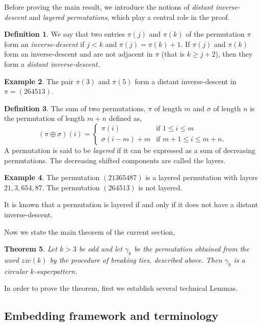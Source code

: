 \documentclass[a4paper,12pt]{article}
\newtheorem{theorem}{Theorem}[section]
\theoremstyle{definition}
\newtheorem{definition}[theorem]{Definition}
\newtheorem{eg}[theorem]{Example}
\numberwithin{equation}{section}
\begin{document}
 Before proving the main result, we introduce the notions of \emph{distant inverse-descent} and \emph{layered permutations}, which play a central role in the proof.

\begin{definition}\cite[Distant inverse-descent]{engen2020containing}
    We say that two entries $\pi(j)$ and $\pi(k)$ of the permutation $\pi$ form an \emph{inverse-descent} if $j<k$ and $\pi(j)=\pi(k)+1$. If $\pi(j)$ and $\pi(k)$ form an inverse-descent and are not adjacent in $\pi$ (that is $k\geq j+2$), then they form a \emph{distant inverse-descent.}
\end{definition}
\begin{eg}
    The pair $\pi(3)$ and $\pi(5)$ form a distant inverse-descent in $\pi=(264513).$
\end{eg}

\begin{definition}\cite[Layered permutation]{engen2020containing}
    The sum of two permutations, $\pi$ of length $m$ and $\sigma$ of length $n$ is the permutation of length $m+n$ defined as, $$(\pi\oplus\sigma)(i)=\begin{cases}
        \pi(i) &\text{if }1\leq i\leq m\\
        \sigma(i-m)+m&\text{if }m+1\leq i\leq m+n.
    \end{cases}$$
    A permutation is said to be \emph{layered} if it can be expressed as a sum of decreasing permutations. The decreasing shifted components are called the layers.
\end{definition}
\begin{eg}
    The permutation $(21365487)$ is a layered permutation with layers $21, 3, 654,87$. The permutation $(264513)$ is not layered.
\end{eg}
It is known \cite[Proposition 12]{engen2020containing} that a permutation is layered if and only if it does not have a distant inverse-descent. 


Now we state the main theorem of the current section,

\begin{theorem}\label{zzc_odd}
Let $k>3$ be odd and let $\gamma_k$ be the permutation obtained from the word $zzc(k)$ by the procedure of breaking ties, described above. 
Then $\gamma_k$ is a circular $k$-superpattern.
\end{theorem}

In order to prove the theorem, first we establish several technical Lemmas.

\subsection{Embedding framework and terminology}
\end{document}

